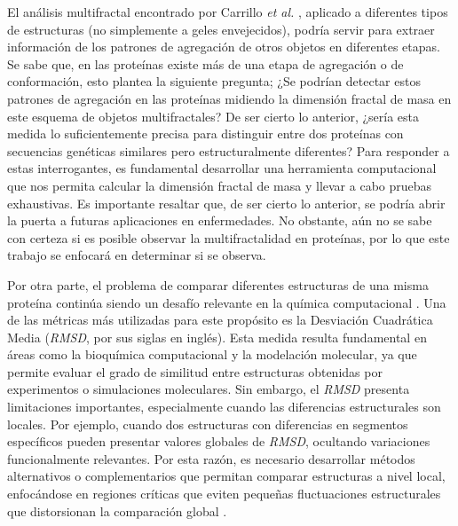 El an\'{a}lisis multifractal encontrado por Carrillo \textit{et al.} \cite{Carrillo2003}, aplicado a diferentes tipos de estructuras (no simplemente a geles envejecidos), podr\'{i}a servir para extraer informaci\'{o}n de los patrones de agregaci\'{o}n de otros objetos en diferentes etapas. Se sabe que, en las prote\'{i}nas existe m\'{a}s de una etapa de agregaci\'{o}n o de conformaci\'{o}n, esto plantea la siguiente pregunta; ¿Se podr\'{i}an detectar estos patrones de agregaci\'{o}n en las prote\'{i}nas midiendo la dimensi\'{o}n fractal de masa en este esquema de objetos multifractales? De ser cierto lo anterior, ¿ser\'{i}a esta medida lo suficientemente precisa para distinguir entre dos prote\'{i}nas con secuencias gen\'{e}ticas similares pero estructuralmente diferentes? Para responder a estas interrogantes, es fundamental desarrollar una herramienta computacional que nos permita calcular la dimensi\'{o}n fractal de masa y llevar a cabo pruebas exhaustivas. Es importante resaltar que, de ser cierto lo anterior, se podr\'{i}a abrir la puerta a futuras aplicaciones en enfermedades. No obstante, a\'{u}n no se sabe con certeza si es posible observar la multifractalidad en prote\'{i}nas, por lo que este trabajo se enfocar\'{a} en determinar si se observa.


\clearpage

Por otra parte, el problema de comparar diferentes estructuras de una misma proteína continúa siendo un desafío relevante en la química computacional \cite{Kufareva2012}. Una de las métricas más utilizadas para este propósito es la Desviación Cuadrática Media (\textit{RMSD}, por sus siglas en inglés). Esta medida resulta fundamental en áreas como la bioquímica computacional y la modelación molecular, ya que permite evaluar el grado de similitud entre estructuras obtenidas por experimentos o simulaciones moleculares. Sin embargo, el \textit{RMSD} presenta limitaciones importantes, especialmente cuando las diferencias estructurales son locales. Por ejemplo, cuando dos estructuras con diferencias en segmentos específicos pueden presentar valores globales de \textit{RMSD}, ocultando variaciones funcionalmente relevantes. Por esta razón, es necesario desarrollar métodos alternativos o complementarios que permitan comparar estructuras a nivel local, enfocándose en regiones críticas que eviten pequeñas fluctuaciones estructurales que distorsionan la comparación global \cite{Kufareva2012}.\\

